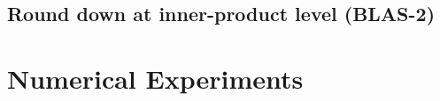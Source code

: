 \documentclass[review,onefignum,onetabnum]{siamart190516}
\begin{document}
\subsection{Round down at inner-product level (BLAS-2)}
\section{Numerical Experiments}

%
%
%
%
%

%
\end{document}
